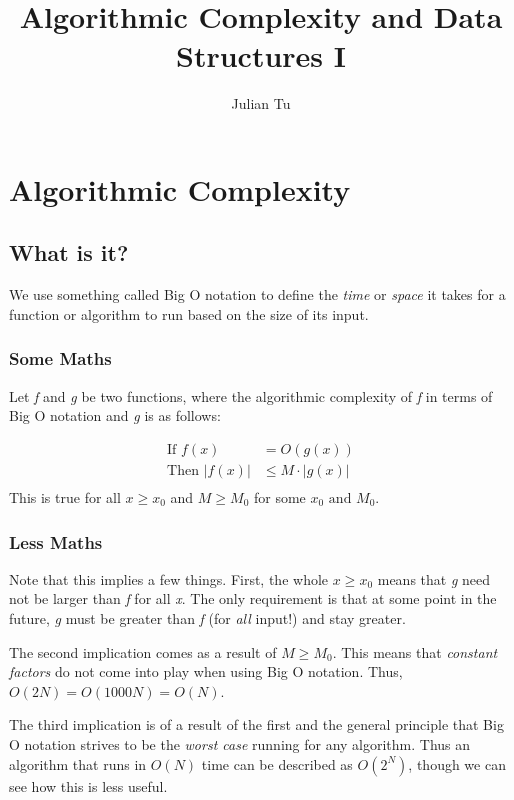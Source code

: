 \documentclass{article}
\title{Algorithmic Complexity and Data Structures I}
\author{Julian Tu}
\begin{document}
\maketitle

\section{Algorithmic Complexity}
\subsection{What is it?}
We use something called Big O notation to define the \emph{time} or \emph{space} it takes for a function or algorithm to run based on the size of its input.

\subsubsection{Some Maths}
Let \emph{f} and \emph{g} be two functions, where the algorithmic complexity of \emph{f} in terms of Big O notation and \emph{g} is as follows:

\begin{align*}
	\text{If } f(x) &= O(g(x))\\
	\text{Then } |f(x)| &\leq M \cdot |g(x)|\\
\end{align*}
This is true for all \(x \geq x_0\) and \(M \geq M_0\) for some \(x_0 \text{ and } M_0\).

\subsubsection{Less Maths}
Note that this implies a few things. First, the whole \(x \geq x_0\) means that \emph{g} need not be larger than \emph{f} for all \emph{x}. The only requirement is that at some point in the future, \emph{g} must be greater than \emph{f} (for \emph{all} input!) and stay greater. 

The second implication comes as a result of \(M \geq M_0\). This means that \emph{constant factors} do not come into play when using Big O notation. Thus, \(O(2N) = O(1000N) = O(N)\). 

The third implication is of a result of the first and the general principle that Big O notation strives to be the \emph{worst case} running for any algorithm. Thus an algorithm that runs in \(O(N)\) time can be described as \(O(2^N)\), though we can see how this is less useful.
\end{document}
